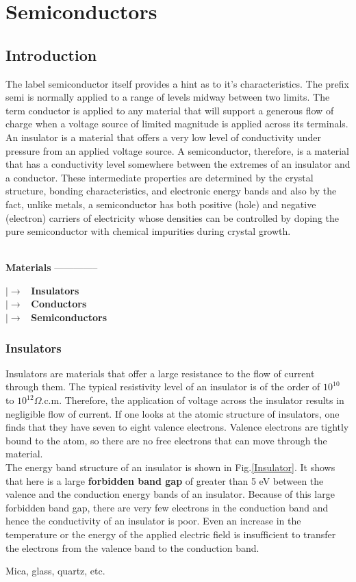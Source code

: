 \chapter{Semiconductors}
\section{Introduction}
The label semiconductor itself provides a hint as to it's characteristics. The prefix semi is normally applied to a range of levels midway between two limits. The term conductor is applied to any material that will support a generous flow of charge when a voltage source of limited magnitude is applied across its terminals. An insulator is a material that offers a very low level of conductivity under pressure from an applied voltage source. A semiconductor, therefore, is a material that has a conductivity level somewhere between the extremes of an insulator and a conductor. These intermediate properties are determined by the crystal structure, bonding characteristics, and electronic energy bands and also by the fact, unlike metals, a semiconductor has both positive (hole) and negative (electron) carriers of electricity whose densities can be controlled by doping the pure semiconductor with chemical impurities during crystal growth.\\\\
\begin{minipage}{0.20\textwidth}
\textbf{Materials} --------------
\end{minipage}
\begin{minipage}{0.25\textwidth}
	$|\rightarrow$ \ \textbf{Insulators}\\
	$|\rightarrow$ \ \textbf{Conductors}\\
	$|\rightarrow$ \ \textbf{Semiconductors}
\end{minipage}
\subsection{Insulators}
Insulators are materials that offer a large resistance to
the flow of current through them. The typical resistivity
level of an insulator is of the order of $10^{10}$ to $10^{12} \Omega. \text{c.m}$. Therefore, the application of voltage across the insulator results in negligible flow of current. If one looks at the atomic structure of insulators, one finds that they have seven to eight valence electrons. Valence electrons are tightly bound to the atom, so there are no free electrons that
can move through the material. \\
The energy band structure of an insulator is shown in Fig.\ref{Insulator}. It shows that here is a large \textbf{forbidden band gap} of greater than 5 eV between the valence and the conduction energy bands of an insulator. Because of this large forbidden band gap, there are very few electrons in the conduction band and hence the conductivity of an insulator is poor. Even an increase in the temperature or the energy of the applied electric field is insufficient to transfer the electrons from the valence band to the conduction band.
\begin{example}
	Mica, glass, quartz, etc.
\end{example}
